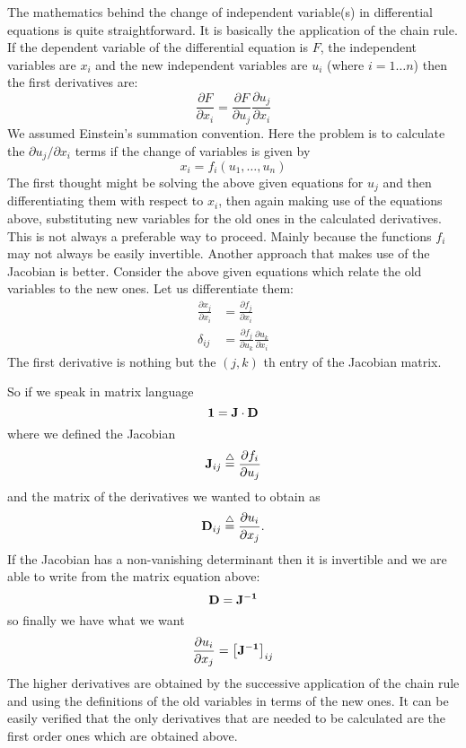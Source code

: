 The mathematics behind the change of independent variable(s) in differential
equations is quite straightforward. It is basically the application of the
chain rule. If the dependent variable of the differential equation is $F$,
the independent variables are $x_{i}$ and the new independent variables are
$u_{i}$ (where ${\scriptstyle i=1\ldots n}$) then the first derivatives are:
\[
    \frac{\partial F}{\partial x_{i}} = \frac{\partial F}{\partial u_{j}}
                                        \frac{\partial u_{j}}{\partial x_{i}}
\]
We assumed Einstein's summation convention. Here the problem is to
calculate the $\partial u_{j}/\partial x_{i}$ terms if the change of variables
is given by
\[
    x_{i} = f_{i}(u_{1},\ldots,u_{n})
\]
The first thought might be solving the above given equations for $u_{j}$ and
then differentiating them with respect to $x_{i}$, then again making use of the
equations above, substituting new variables for the old ones in the calculated
derivatives. This is not always a  preferable way to proceed. Mainly because
the functions $f_{i}$ may not always be easily invertible. Another approach
that makes use of the Jacobian is better. Consider the above given equations
which relate the old variables to the new ones. Let us differentiate them:
\begin{align*}
  \frac{\partial x_{j}}{\partial x_{i}} & =
        \frac{\partial f_{j}}{\partial x_{i}}   \\
  \delta_{ij} & =
        \frac{\partial f_{j}}{\partial u_{k}}
        \frac{\partial u_{k}}{\partial x_{i}}
\end{align*}
The first derivative is nothing but the $(j,k)$ th entry of the Jacobian matrix.

So if we speak in matrix language
\[ {\bf 1 = J \cdot D} \]
where we defined the Jacobian
\[ {\bf J}_{ij} \stackrel{\triangle}{=}  \frac{\partial f_{i}}{\partial u_{j}} \]
and the matrix of the derivatives we wanted to obtain as
\[ {\bf D}_{ij} \stackrel{\triangle}{=}  \frac{\partial u_{i}}{\partial x_{j}}. \]
If the Jacobian has a non-vanishing determinant then it is invertible and
we are able to write from the matrix equation above:
\[ {\bf  D = J^{-1}} \]
so finally we have what we want
\[
   \frac{\partial u_{i}}{\partial x_{j}} = \left[{\bf J^{-1}}\right]_{ij}
\]
The higher derivatives are obtained by the successive application of the chain
rule and using the definitions of the old variables in terms of the new ones. It
can be easily verified that the only derivatives that are needed to be
calculated are the first order ones which are obtained above.

